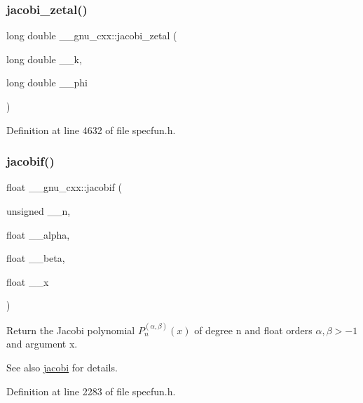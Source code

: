 \subsubsection{\texorpdfstring{jacobi\+\_\+zetal()}{jacobi\_zetal()}}
{\footnotesize\ttfamily long double \+\_\+\+\_\+gnu\+\_\+cxx\+::jacobi\+\_\+zetal (\begin{DoxyParamCaption}\item[{long double}]{\+\_\+\+\_\+k,  }\item[{long double}]{\+\_\+\+\_\+phi }\end{DoxyParamCaption})\hspace{0.3cm}{\ttfamily [inline]}}



Definition at line 4632 of file specfun.\+h.

\mbox{\label{group__mathsf__gnu_ga450db12e06d6993d169afab5b3f6d0b8}} 
\subsubsection{\texorpdfstring{jacobif()}{jacobif()}}
{\footnotesize\ttfamily float \+\_\+\+\_\+gnu\+\_\+cxx\+::jacobif (\begin{DoxyParamCaption}\item[{unsigned}]{\+\_\+\+\_\+n,  }\item[{float}]{\+\_\+\+\_\+alpha,  }\item[{float}]{\+\_\+\+\_\+beta,  }\item[{float}]{\+\_\+\+\_\+x }\end{DoxyParamCaption})\hspace{0.3cm}{\ttfamily [inline]}}

Return the Jacobi polynomial $ P_n^{(\alpha,\beta)}(x) $ of degree {\ttfamily n} and {\ttfamily float} orders $ \alpha, \beta > -1 $ and argument {\ttfamily x}.

\begin{DoxySeeAlso}{See also}
\hyperlink{group__mathsf__gnu_gad54f6601748324d268532138eb38ca33}{jacobi} for details. 
\end{DoxySeeAlso}


Definition at line 2283 of file specfun.\+h.



